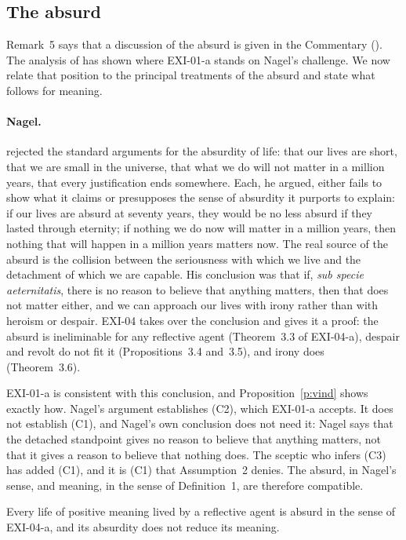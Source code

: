 \subsection{The absurd}\label{s:absurd}

Remark~5 says that a discussion of the absurd is given in the Commentary (). The analysis of  has shown where EXI-01-a stands on Nagel's challenge. We now relate that position to the principal treatments of the absurd and state what follows for meaning.

\paragraph{Nagel.} \citet{Nagel1971} rejected the standard arguments for the absurdity of life: that our lives are short, that we are small in the universe, that what we do will not matter in a million years, that every justification ends somewhere. Each, he argued, either fails to show what it claims or presupposes the sense of absurdity it purports to explain: if our lives are absurd at seventy years, they would be no less absurd if they lasted through eternity; if nothing we do now will matter in a million years, then nothing that will happen in a million years matters now. The real source of the absurd is the collision between the seriousness with which we live and the detachment of which we are capable. His conclusion was that if, \emph{sub specie aeternitatis}, there is no reason to believe that anything matters, then that does not matter either, and we can approach our lives with irony rather than with heroism or despair. EXI-04 takes over the conclusion and gives it a proof: the absurd is ineliminable for any reflective agent (Theorem~3.3 of EXI-04-a), despair and revolt do not fit it (Propositions~3.4 and~3.5), and irony does (Theorem~3.6).

EXI-01-a is consistent with this conclusion, and Proposition~\ref{p:vind} shows exactly how. Nagel's argument establishes (C2), which EXI-01-a accepts. It does not establish (C1), and Nagel's own conclusion does not need it: Nagel says that the detached standpoint gives no reason to believe that anything matters, not that it gives a reason to believe that nothing does. The sceptic who infers (C3) has added (C1), and it is (C1) that Assumption~2 denies. The absurd, in Nagel's sense, and meaning, in the sense of Definition~1, are therefore compatible.

\begin{proposition}\label{p:compat}
Every life of positive meaning lived by a reflective agent is absurd in the sense of EXI-04-a, and its absurdity does not reduce its meaning.
\end{proposition}

